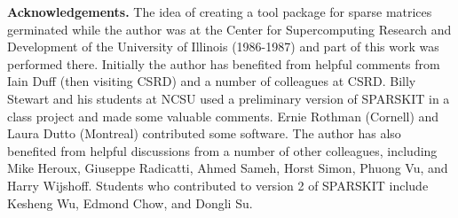 \documentclass[12pt]{article}
\begin{document}
\vskip 1.3in
\noindent
{\bf Acknowledgements.} The idea of creating a tool package for
sparse matrices germinated while the author was at the Center for 
Supercomputing Research and Development of the University of Illinois
(1986-1987) and part of this work was performed there. 
Initially the author has benefited from helpful comments from Iain Duff
(then visiting CSRD) and a number of colleagues at CSRD.  
Billy Stewart and his students at NCSU used a preliminary version of 
SPARSKIT in a class project and made some
valuable comments. Ernie Rothman (Cornell) and
Laura Dutto (Montreal) contributed some software.
The author has also benefited from helpful discussions
from a number of other colleagues, including 
Mike Heroux, Giuseppe Radicatti, Ahmed Sameh, Horst Simon, 
Phuong Vu, and Harry Wijshoff.  Students who contributed to
version 2 of SPARSKIT include Kesheng Wu, Edmond Chow, and Dongli Su.
\end{document}

